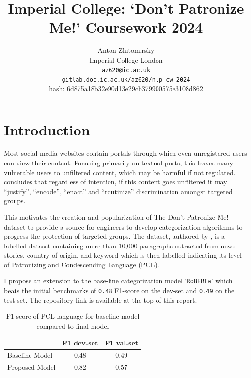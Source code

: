 \documentclass[11pt,a4paper]{article}
\title{Imperial College: `Don't Patronize Me!' Coursework 2024}
\author{Anton Zhitomirsky \\
  Imperial College London \\
  \texttt{az620@ic.ac.uk} \\
  \href{https://gitlab.doc.ic.ac.uk/az620/nlp-cw-2024}{\texttt{gitlab.doc.ic.ac.uk/az620/nlp-cw-2024}} \\
  hash: 6d875a18b32e90d13e29cb379900575e3108d862 \\ 
}
\begin{document}
\maketitle

\section{Introduction}


Most social media websites contain portals through which even unregistered users can view their content. Focusing primarily on textual posts, this leaves many vulnerable users to unfiltered content, which may be harmful if not regulated. \citet{Ng-discrimination} concludes that regardless of intention, if this content goes unfiltered it may ``justify'', ``encode'', ``enact'' and ``routinize'' discrimination amongst targeted groups.

This motivates the creation and popularization of The Don't Patronize Me! dataset to provide a source for engineers to develop categorization algorithms to progress the protection of targeted groups. The dataset, authored by \citet{perez-almendros-etal-2020-dont}, is a labelled dataset containing more than 10,000 paragraphs extracted from news stories, country of origin, and keyword which is then labelled indicating its level of Patronizing and Condescending Language (PCL).

I propose an extension to the base-line categorization model `\texttt{RoBERTa}' which beats the initial benchmarks of \texttt{0.48} F1-score on the dev-set and \texttt{0.49} on the test-set. The repository link is available at the top of this report.

\begin{table}[!h]
    \centering
    \begin{tabular}{|l||c|c|}
        \hline
         & F1 dev-set & F1 val-set \\
        \hline
        \hline
        Baseline Model & 0.48 & 0.49 \\
        \hline
        Proposed Model  & 0.82 & 0.57 \\
        \hline
    \end{tabular}
    \caption{F1 score of PCL language for baseline model compared to final model}    
\end{table}
\end{document}
